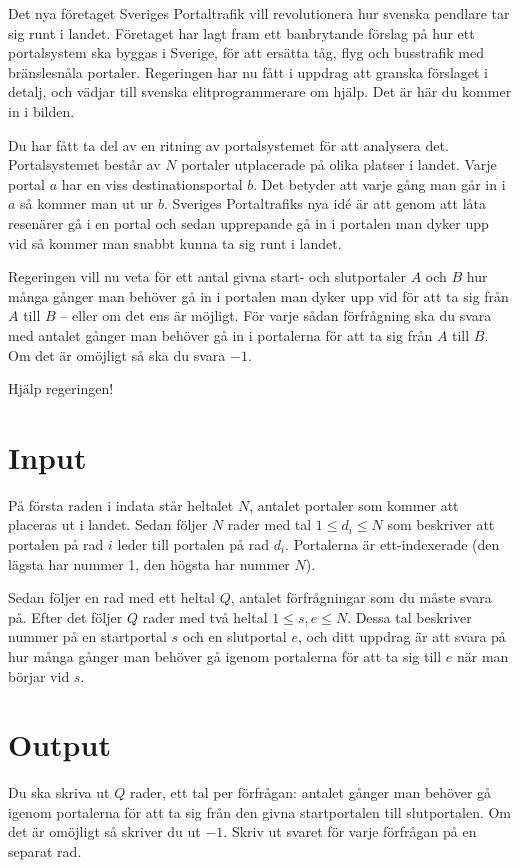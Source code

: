 
Det nya företaget Sveriges Portaltrafik vill revolutionera hur svenska
pendlare tar sig runt i landet. Företaget har lagt fram
ett banbrytande förslag på hur ett portalsystem ska byggas i Sverige, för
att ersätta tåg, flyg och busstrafik med bränslesnåla portaler. Regeringen
har nu fått i uppdrag att granska förslaget i detalj, och vädjar till
svenska elitprogrammerare om hjälp. Det är här du kommer in i bilden.

Du har fått ta del av en ritning av portalsystemet för att analysera det.
Portalsystemet består av $N$ portaler utplacerade på olika platser i landet. Varje portal $a$
har en viss destinationsportal $b$. Det betyder att varje gång man går in i $a$ så kommer man
ut ur $b$. Sveriges Portaltrafiks nya idé är att genom att låta resenärer gå
i en portal och sedan upprepande gå in i portalen man dyker upp vid så kommer man snabbt
kunna ta sig runt i landet.

Regeringen vill nu veta för ett antal givna start- och slutportaler $A$ och $B$
hur många gånger man behöver gå in i portalen man dyker upp vid för att ta sig från $A$ till
$B$ -- eller om det ens är möjligt. För varje sådan förfrågning ska du svara med antalet
gånger man behöver gå in i portalerna för att ta sig från $A$ till $B$. Om det är omöjligt
så ska du svara $-1$.

Hjälp regeringen!

\section*{Input}

På första raden i indata står heltalet $N$, antalet portaler som kommer att placeras ut i landet.
Sedan följer $N$ rader med tal $1 \le d_i \le N$ som beskriver att portalen på rad $i$ leder till portalen på
rad $d_i$. Portalerna är ett-indexerade (den lägsta har nummer 1, den högsta har nummer $N$).

Sedan följer en rad med ett heltal $Q$, antalet förfrågningar som du måste svara på. Efter det
följer $Q$ rader med två heltal $1 \le s, e \le N$. Dessa tal beskriver nummer på en startportal $s$ och en
slutportal $e$, och ditt uppdrag är att svara på hur många gånger man behöver gå igenom portalerna
för att ta sig till $e$ när man börjar vid $s$.

\section*{Output}
Du ska skriva ut $Q$ rader, ett tal per förfrågan: antalet gånger man behöver gå
igenom portalerna för att ta sig från den givna startportalen till
slutportalen. Om det är omöjligt så skriver du ut $-1$. Skriv ut svaret
för varje förfrågan på en separat rad.

